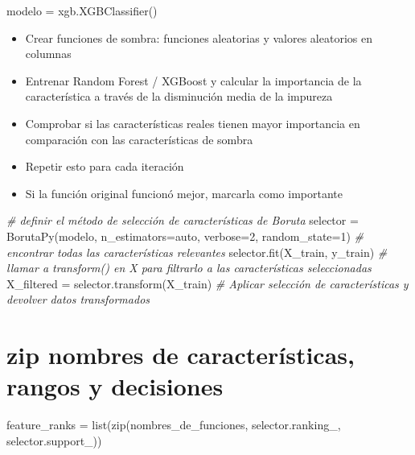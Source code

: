 \documentclass[
]{article}
\newenvironment{Shaded}{}{}
\newcommand{\BuiltInTok}[1]{#1}
\newcommand{\CommentTok}[1]{\textcolor[rgb]{0.38,0.63,0.69}{\textit{#1}}}
\newcommand{\DecValTok}[1]{\textcolor[rgb]{0.25,0.63,0.44}{#1}}
\newcommand{\NormalTok}[1]{#1}
\newcommand{\OperatorTok}[1]{\textcolor[rgb]{0.40,0.40,0.40}{#1}}
\newcommand{\StringTok}[1]{\textcolor[rgb]{0.25,0.44,0.63}{#1}}
\providecommand{\tightlist}{%
  \setlength{\itemsep}{0pt}\setlength{\parskip}{0pt}}
\begin{document}
\begin{Shaded}
\begin{Highlighting}[]
\NormalTok{modelo }\OperatorTok{=}\NormalTok{ xgb.XGBClassifier()}
\end{Highlighting}
\end{Shaded}

\begin{itemize}
\tightlist
\item
  Crear funciones de sombra: funciones aleatorias y valores aleatorios
  en columnas
\item
  Entrenar Random Forest / XGBoost y calcular la importancia de la
  característica a través de la disminución media de la impureza
\item
  Comprobar si las características reales tienen mayor importancia en
  comparación con las características de sombra
\item
  Repetir esto para cada iteración
\item
  Si la función original funcionó mejor, marcarla como importante
\end{itemize}

\begin{Shaded}
\begin{Highlighting}[]
\CommentTok{\# definir el método de selección de características de Boruta}
\NormalTok{selector }\OperatorTok{=}\NormalTok{ BorutaPy(modelo, n\_estimators}\OperatorTok{=}\StringTok{\textquotesingle{}auto\textquotesingle{}}\NormalTok{, verbose}\OperatorTok{=}\DecValTok{2}\NormalTok{, random\_state}\OperatorTok{=}\DecValTok{1}\NormalTok{)}
\CommentTok{\# encontrar todas las características relevantes}
\NormalTok{selector.fit(X\_train, y\_train)}
\CommentTok{\# llamar a transform() en X para filtrarlo a las características seleccionadas}
\NormalTok{X\_filtered }\OperatorTok{=}\NormalTok{ selector.transform(X\_train)  }\CommentTok{\# Aplicar selección de características y devolver datos transformados}
\end{Highlighting}
\end{Shaded}

\hypertarget{zip-nombres-de-caracteruxedsticas-rangos-y-decisiones}{%
\section{zip nombres de características, rangos y
decisiones}\label{zip-nombres-de-caracteruxedsticas-rangos-y-decisiones}}

\begin{Shaded}
\begin{Highlighting}[]
\NormalTok{feature\_ranks }\OperatorTok{=} \BuiltInTok{list}\NormalTok{(}\BuiltInTok{zip}\NormalTok{(nombres\_de\_funciones, }
\NormalTok{                         selector.ranking\_, }
\NormalTok{                         selector.support\_))}
\end{Highlighting}
\end{Shaded}
\end{document}
